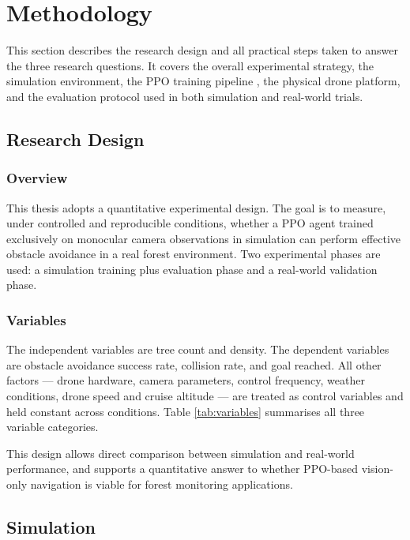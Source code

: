 \documentclass[../main.tex]{subfiles}
\begin{document}
\section{Methodology}
\justify

This section describes the research design and all practical steps taken to answer the three research questions. It covers the overall experimental strategy, the simulation environment, the PPO training pipeline \cite{Schulman2017}, the physical drone platform, and the evaluation protocol used in both simulation and real-world trials.

\subsection{Research Design}

\subsubsection{Overview}

This thesis adopts a quantitative experimental design. The goal is to measure, under controlled and reproducible conditions, whether a PPO agent trained exclusively on monocular camera observations in simulation can perform effective obstacle avoidance in a real forest environment. Two experimental phases are used: a simulation training plus evaluation phase and a real-world validation phase.

\subsubsection{Variables}

The independent variables are tree count and density. The dependent variables are obstacle avoidance success rate, collision rate, and goal reached. All other factors --- drone hardware, camera parameters, control frequency, weather conditions, drone speed and cruise altitude --- are treated as control variables and held constant across conditions. Table \ref{tab:variables} summarises all three variable categories.

This design allows direct comparison between simulation and real-world performance, and supports a quantitative answer to whether PPO-based vision-only navigation is viable for forest monitoring applications.



\subsection{Simulation}
\end{document}
